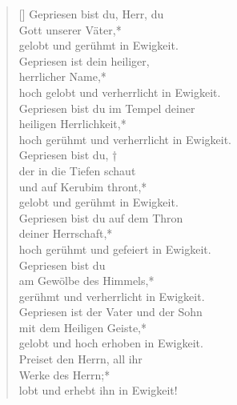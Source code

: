\begin{verse}[\versewidth]
Gepriesen bist du, Herr, du\\
Gott unserer Väter,*\\
gelobt und gerühmt in Ewigkeit.\\
\vin Gepriesen ist dein heiliger,\\
\vin herrlicher Name,*\\
\vin hoch gelobt und verherrlicht in Ewigkeit.\\
Gepriesen bist du im Tempel deiner \\
heiligen Herrlichkeit,*\\
hoch gerühmt und verherrlicht in Ewigkeit.\\
\vin Gepriesen bist du, †\\
\vin der in die Tiefen schaut\\
\vin und auf Kerubim thront,*\\
\vin gelobt und gerühmt in Ewigkeit.\\
Gepriesen bist du auf dem Thron \\
deiner Herrschaft,*\\
hoch gerühmt und gefeiert in Ewigkeit.\\
\vin Gepriesen bist du\\
\vin am Gewölbe des Himmels,*\\
\vin gerühmt und verherrlicht in Ewigkeit.\\
Gepriesen ist der Vater und der Sohn\\
mit dem Heiligen Geiste,*\\
gelobt und hoch erhoben in Ewigkeit.\\
\vin Preiset den Herrn, all ihr\\
\vin Werke des Herrn;*\\
\vin lobt und erhebt ihn in Ewigkeit!\\

\end{verse}


\vspace{0.6cm}

\def\greinitialformat#1{{\fontsize{40}{40}\selectfont #1}}
\gresetfirstlineaboveinitial{\small \textcolor{red}{Ps 148}}{}
\setaboveinitialseparation{0.72mm}


